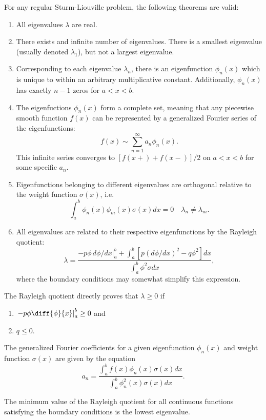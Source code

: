 \documentclass{article}
\begin{document}
\begin{theorem}
	For any regular Sturm-Liouville problem, the following theorems are valid:
	\begin{enumerate}
		\item All eigenvalues \(\lambda\) are real.
		\item There exists and infinite number of eigenvalues. There is a smallest eigenvalue (usually denoted \(\lambda_1\)), but not a largest eigenvalue.
		\item Corresponding to each eigenvalue \(\lambda_n\), there is an eigenfunction \(\phi_n(x)\) which is unique to within an arbitrary multiplicative constant. Additionally, \(\phi_n(x)\) has exactly \(n-1\) zeros for \(a<x<b\).
		\item The eigenfuctions \(\phi_n(x)\) form a complete set, meaning that any piecewise smooth function \(f(x)\) can be represented by a generalized Fourier series of the eigenfunctions:
			\begin{equation*}
				f(x)\sim\sum_{n=1}^{\infty}a_n\phi_n(x).
			\end{equation*}
			This infinite series converges to \([f(x+)+f(x-)]/2\) on \(a<x<b\) for some specific \(a_n\).
		\item Eigenfunctions belonging to different eigenvalues are orthogonal relative to the weight function \(\sigma(x)\), i.e.
			\begin{equation*}
				\int_{a}^{b}\phi_n(x)\phi_m(x)\sigma(x)dx=0\quad\lambda_n\neq\lambda_m.
			\end{equation*}
		\item All eigenvalues are related to their respective eigenfunctions by the Rayleigh quotient:
			\begin{equation*}
				\lambda=\frac{-p\phi\,d\phi/dx|_a^b+\int_a^b[p(d\phi/dx)^2-q\phi^2]dx}{\int_{a}^{b}\phi^2\sigma dx},
			\end{equation*}
			where the boundary conditions may somewhat simplify this expression.
	\end{enumerate}
\end{theorem}
\begin{remark}
	The Rayleigh quotient directly proves that \(\lambda\geq 0\) if
	\begin{enumerate}
		\item \(\Eval{-p\phi\diff{\phi}{x}}{a}{b}\geq 0\) and
		\item \(q\leq 0\).
	\end{enumerate}
\end{remark}
\begin{proposition}
	The generalized Fourier coefficients for a given eigenfunction \(\phi_n(x)\) and weight function \(\sigma(x)\) are given by the equation
	\begin{equation*}
		a_n=\frac{\int_a^b f(x)\phi_n(x)\sigma(x)dx}{\int_a^b \phi^2_n(x)\sigma(x)dx}.
	\end{equation*}
\end{proposition}
\begin{theorem}
	The minimum value of the Rayleigh quotient for all continuous functions satisfying the boundary conditions is the lowest eigenvalue.
\end{theorem}
\end{document}
